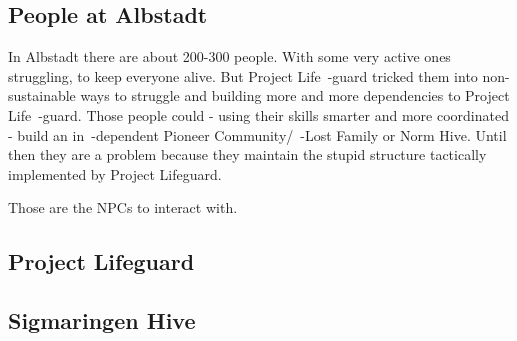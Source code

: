 
\subsection{People at Albstadt}

In Albstadt there are about 200-300 people. With some very active ones struggling, to keep everyone alive. But Project Life~-guard tricked them into non-sustainable ways to struggle and building more and more dependencies to Project Life~-guard. Those people could - using their skills smarter and more coordinated - build an in~-dependent Pioneer Community/~-Lost Family or Norm Hive. Until then they are a problem because they maintain the stupid structure tactically implemented by Project Lifeguard.

Those are the NPCs to interact with.


\subsection{Project Lifeguard}


\subsection{Sigmaringen Hive}

